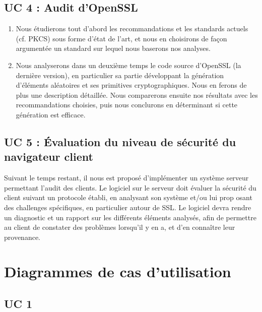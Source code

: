 \documentclass[a4paper,11pt,french]{article}
\begin{document}
\subsection{UC 4 : Audit d'OpenSSL}
\begin{enumerate}
 	\item Nous étudierons tout d'abord les recommandations et les standards actuels (cf. PKCS) sous forme d'état de l'art, et nous en choisirons de façon argumentée un standard sur lequel nous baserons nos analyses.
	\item Nous analyserons dans un deuxième temps le code source d'OpenSSL (la dernière version), en particulier sa partie développant la génération d'éléments aléatoires et ses primitives cryptographiques. Nous en ferons de plus une description détaillée. Nous comparerons ensuite nos résultats avec les recommandations choisies, puis nous conclurons en déterminant si cette génération est efficace.
\end{enumerate}


\subsection{UC 5 : Évaluation du niveau de sécurité du navigateur client}
Suivant le temps restant, il nous est proposé d'implémenter un système serveur permettant l'audit des clients. Le logiciel sur le serveur doit évaluer la sécurité du client suivant un protocole établi, en analysant son système et/ou lui prop osant des challenges spécifiques, en particulier autour de SSL. Le logiciel devra rendre un diagnostic et un rapport sur les différents éléments analysés, afin de permettre au client de constater des problèmes lorsqu'il y en a, et d'en connaître leur provenance.

\section{Diagrammes de cas d'utilisation}

\subsection{UC 1}

\setlength{\fboxrule}{0.1mm}

\end{document}
